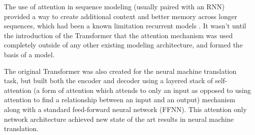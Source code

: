 The use of attention in sequence modeling (usually paired with an RNN) provided a way to create additional context and better memory across longer sequences, which had been a known limitation recurrent models . It wasn't until the introduction of the Transformer that the attention mechanism was used completely outside of any other existing modeling architecture, and formed the basis of a model. 

The original Transformer \cite{vaswani2017attention} was also created for the neural machine translation task, but built both the encoder and decoder using a layered stack of self-attention (a form of attention which attends to only an input as opposed to using attention to find a relationship between an input and an output) mechanism along with a standard feed-forward neural network (FFNN). This attention only network architecture achieved new state of the art results in neural machine translation. 



